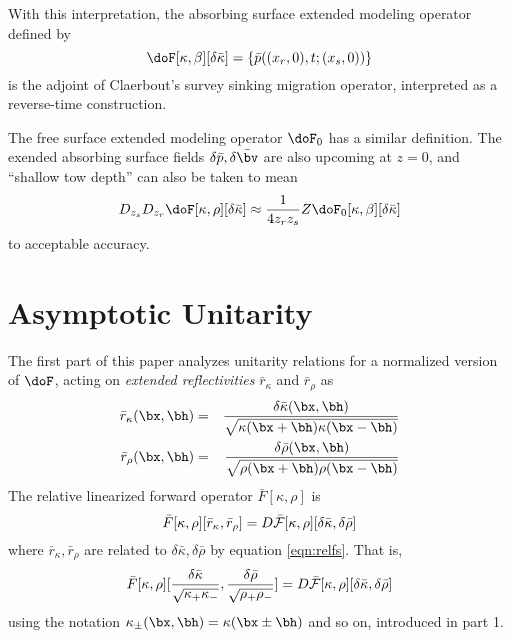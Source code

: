 With this
interpretation, the absorbing surface extended modeling operator defined by 
\begin{equation}
\label{eqn:extop}
\doF[\kappa,\beta][\delta \bar{\kappa}] =
\{\bar{p}((x_r,0),t;(x_s,0))\}
\end{equation}
is the adjoint of Claerbout's survey sinking migration operator,
interpreted as a reverse-time construction. 

The free surface extended modeling operator $\doF_0$ has a similar
definition. The exended absorbing surface fields $\delta
\bar{p},\delta \bar{\bv}$ are also upcoming at $z=0$, and ``shallow
tow depth'' can also be taken to mean
\begin{equation}
\label{eqn:opdipole}
D_{z_s}D_{z_r}\doF[\kappa,\rho][\delta \bar{\kappa}]\approx 
\frac{1}{4z_rz_s} Z \doF_0[\kappa,\beta][\delta \bar{\kappa}]
\end{equation}
to acceptable accuracy.

\section{Asymptotic Unitarity}
The first part of this paper analyzes unitarity relations for a
normalized version of $\doF$, acting on {\em extended reflectivities} $\bar{r}_{\kappa}$
and $\bar{r}_{\rho}$ as 
\begin{eqnarray}
\label{eqn:relfs}
\bar{r}_{\kappa}(\bx,\bh)& = & \frac{\delta \bar{\kappa}(\bx,\bh)}{\sqrt{\kappa(\bx+\bh)\kappa(\bx-\bh)}} \nonumber \\
\bar{r}_{\rho}(\bx,\bh)& = & \frac{\delta \bar{\rho}(\bx,\bh)}{\sqrt{\rho(\bx+\bh)\rho(\bx-\bh)}}
\end{eqnarray}
The relative linearized forward operator $\bar{F}[\kappa,\rho]$ is
\begin{equation}
\label{eqn:nondim}
\bar{F}[\kappa,\rho][\bar{r}_{\kappa},\bar{r}_{\rho}] =
D\bar{{\cal F}}[\kappa,\rho][\delta 
\bar{\kappa},\delta\bar{\rho}]
\end{equation}
where $\bar{r}_{\kappa},\bar{r}_{\rho}$ are related to $\delta 
\bar{\kappa},\delta\bar{\rho}$ by equation \ref{eqn:relfs}. That is, 
\begin{equation}
\label{eqn:nondimbis}
\bar{F}[\kappa,\rho][\frac{\delta \bar{\kappa}}{\sqrt{\kappa_+\kappa_-}}, \frac{\delta \bar{\rho}}{\sqrt{\rho_+\rho_-}}] =
D\bar{{\cal F}}[\kappa,\rho][\delta 
\bar{\kappa},\delta\bar{\rho}]
\end{equation}
using the notation $\kappa_{\pm}(\bx,\bh) = \kappa(\bx \pm \bh)$ and
so on, introduced in part 1. 

